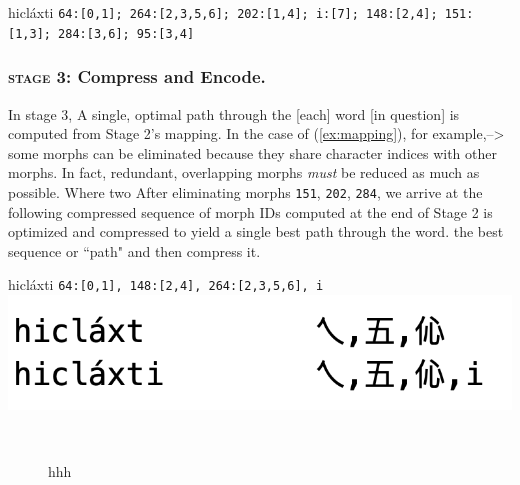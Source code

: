  \begin{exe} \ex \label{ex:mapping} hicl\'{a}xti \quad \texttt{64:[0,1]; 264:[2,3,5,6]; 202:[1,4]; i:[7]; 148:[2,4]; 151:[1,3]; 284:[3,6]; 95:[3,4]}
\end{exe}               

\subsubsection{\textsc{stage 3:} Compress and Encode.} In stage 3,
A single, optimal path through the [each] word [in question] is computed from Stage 2's mapping. In the case of (\ref{ex:mapping}), for example,-->  
some morphs can be eliminated because they share character indices with other morphs. In fact, redundant, overlapping morphs
\emph{must} be reduced as much as possible. Where two 
 After eliminating morphs \texttt{151}, \texttt{202}, \texttt{284}, 
we arrive at the following compressed sequence of morph IDs computed at the end of Stage 2
is optimized and compressed to yield a single best path through the word. 
 the best sequence or ``path" and then compress it. 
\begin{exe} \ex \label{ex:comp-with-indices} 
hicl\'{a}xti \quad \texttt{64:[0,1], 148:[2,4], 264:[2,3,5,6], i}
\ex %
\includegraphics[scale=.3]{cjk-mappings-0}
\end{exe}

\begin{figure}[h]
\centering
{} \\[\baselineskip]
\label{tab:morphs-chinese}
\caption{hhh}
\end{figure}

